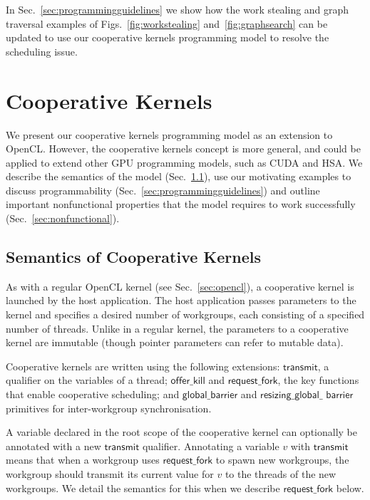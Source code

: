 \documentclass[sigconf]{acmart}
\newcommand{\myfigs}{Figs.~}
\newcommand{\mysec}{Sec.~}
\newcommand{\transmit}{\mathsf{transmit}}
\newcommand{\offerfork}{\mathsf{request\_fork}}
\newcommand{\offerkill}{\mathsf{offer\_kill}}
\newcommand{\globalbarrier}{\mathsf{global\_barrier}}
\newcommand{\resizingglobalbarrier}{\mathsf{resizing\_global\_barrier}}
\begin{document}
In \mysec\ref{sec:programmingguidelines} we show how the work stealing
and graph traversal examples of \myfigs\ref{fig:workstealing} and~\ref{fig:graphsearch} can be
updated to use our cooperative kernels programming model to resolve
the scheduling issue.


\section{Cooperative Kernels}\label{sec:cooperativekernels}

We present our cooperative kernels programming model as an extension
to OpenCL.  However, the cooperative kernels concept is more general,
and could be applied to extend other GPU programming models, such as
CUDA and HSA.  We describe the semantics of the model
(\mysec\ref{sec:semantics}), use our motivating examples to discuss
programmability (\mysec\ref{sec:programmingguidelines}) and outline
important nonfunctional properties that the model requires to work
successfully (\mysec\ref{sec:nonfunctional}).
%

\subsection{Semantics of Cooperative Kernels}\label{sec:semantics}

As with a regular OpenCL kernel (see \mysec\ref{sec:opencl}), a
cooperative kernel is launched by the host application.  The host
application passes parameters to the kernel and specifies a desired
number of workgroups, each consisting of a specified number of
threads.  Unlike in a regular kernel, the parameters to a cooperative kernel are immutable (though pointer
parameters can refer to mutable data).

Cooperative kernels are written using the following
extensions: $\transmit$, a qualifier on the variables of a
thread; $\offerkill$ and $\offerfork$, the key functions that enable
cooperative scheduling; and $\globalbarrier$ and $\mathsf{resizing\_global\_}$ $\mathsf{barrier}$
primitives for inter-workgroup synchronisation.

%
A variable declared in the root scope of the cooperative kernel can
optionally be annotated with a new $\transmit$ qualifier.  Annotating
a variable $v$ with $\transmit$ means that when a workgroup 
uses $\offerfork$ to spawn new
workgroups, the workgroup should transmit its
current value for $v$ to the threads of the new workgroups.
We detail the semantics for this when we
describe $\offerfork$ below.
\end{document}
